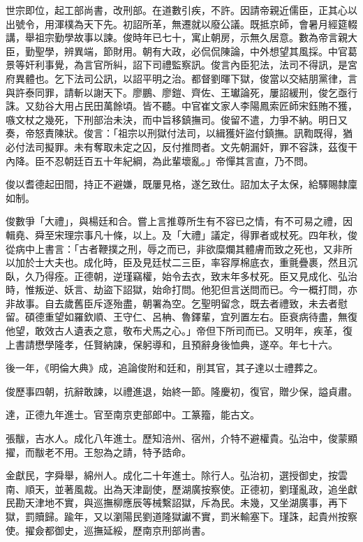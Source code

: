 \begin{pinyinscope}
世宗即位，起工部尚書，改刑部。在道數引疾，不許。因請帝親近儒臣，正其心以出號令，用渾樸為天下先。初詔所革，無遷就以廢公議。既抵京師，會暑月經筵輟講，舉祖宗勤學故事以諫。俊時年已七十，寓止朝房，示無久居意。數為帝言親大臣，勤聖學，辨異端，節財用。朝有大政，必侃侃陳論，中外想望其風採。中官葛景等奸利事覺，為言官所糾，詔下司禮監察訊。俊言內臣犯法，法司不得訊，是宮府異體也。乞下法司公訊，以詔平明之治。都督劉暉下獄，俊當以交結朋黨律，言與許泰同罪，請斬以謝天下。廖鵬、廖鎧、齊佐、王瓛論死，屢詔緩刑，俊乞亟行誅。又劾谷大用占民田萬餘頃。皆不聽。中官崔文家人李陽鳳索匠師宋鈺賄不獲，嗾文杖之幾死，下刑部治未決，而中旨移鎮撫司。俊留不遣，力爭不納。明日又奏，帝怒責陳狀。俊言：「祖宗以刑獄付法司，以緝獲奸盜付鎮撫。訊鞫既得，猶必付法司擬罪。未有奪取未定之囚，反付推問者。文先朝漏奸，罪不容誅，茲復干內降。臣不忍朝廷百五十年紀綱，為此輩壞亂。」帝憚其言直，乃不問。

俊以耆德起田間，持正不避嫌，既屢見格，遂乞致仕。詔加太子太保，給驛賜隸廩如制。

俊數爭「大禮」，與楊廷和合。嘗上言推尊所生有不容已之情，有不可易之禮，因輯堯、舜至宋理宗事凡十條，以上。及「大禮」議定，得罪者或杖死。四年秋，俊從病中上書言：「古者鞭撲之刑，辱之而已，非欲糜爛其體膚而致之死也，又非所以加於士大夫也。成化時，臣及見廷杖二三臣，率容厚棉底衣，重氈疊裹，然且沉臥，久乃得痊。正德朝，逆瑾竊權，始令去衣，致末年多杖死。臣又見成化、弘治時，惟叛逆、妖言、劫盜下詔獄，始命打問。他犯但言送問而已。今一概打問，亦非故事。自去歲舊臣斥逐殆盡，朝署為空。乞聖明留念，既去者禮致，未去者慰留。碩德重望如羅欽順、王守仁、呂柟、魯鐸輩，宜列置左右。臣衰病待盡，無復他望，敢效古人遺表之意，敬布犬馬之心。」帝但下所司而已。又明年，疾革，復上書請懋學隆孝，任賢納諫，保躬導和，且預辭身後恤典，遂卒。年七十六。

後一年，《明倫大典》成，追論俊附和廷和，削其官，其子達以士禮葬之。

俊歷事四朝，抗辭敢諫，以禮進退，始終一節。隆慶初，復官，贈少保，謚貞肅。

達，正德九年進士。官至南京吏部郎中。工篆籀，能古文。

張黻，吉水人。成化八年進士。歷知涪州、宿州，介特不避權貴。弘治中，俊蒙顯擢，而黻老不用。王恕為之請，特予誥命。

金獻民，字舜舉，綿州人。成化二十年進士。除行人。弘治初，選授御史，按雲南、順天，並著風裁。出為天津副使，歷湖廣按察使。正德初，劉瑾亂政，追坐獻民勘天津地不實，與巡撫柳應辰等械繫詔獄，斥為民。未幾，又坐湖廣事，再下獄，罰贖歸。踰年，又以瀏陽民劉道隆獄讞不實，罰米輸塞下。瑾誅，起貴州按察使。擢僉都御史，巡撫延綏，歷南京刑部尚書。


\end{pinyinscope}
